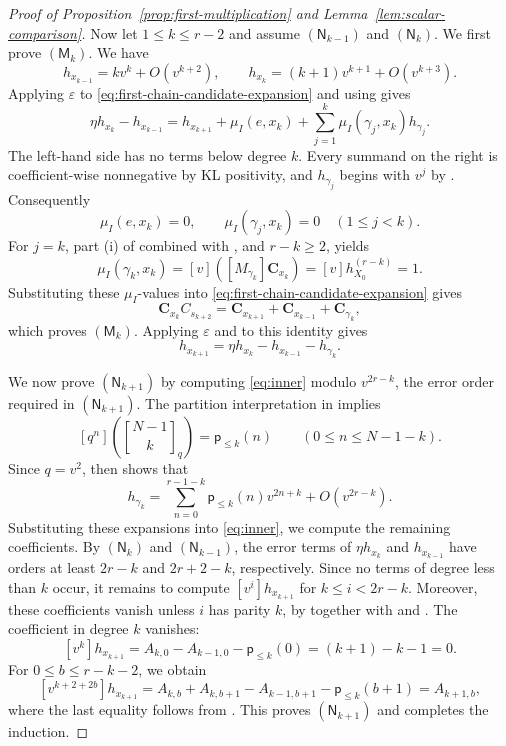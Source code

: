 \documentclass[11pt,a4paper,reqno]{amsart}
\numberwithin{equation}{section}
\theoremstyle{definition}
\theoremstyle{remark}
\theoremstyle{plain}
\newcommand{\C}{\mathbf C}
\newcommand{\eps}{\varepsilon}
\newcommand{\gb}[2]{\genfrac{[}{]}{0pt}{}{#1}{#2}_q}
\newcommand{\mus}{\mu_I}
\newcommand{\Part}{\mathsf p}
\begin{document}
\begin{proof}[Proof of Proposition~\ref{prop:first-multiplication} and
Lemma~\ref{lem:scalar-comparison}]
Now let $1\leq k\leq r-2$ and assume $(\mathsf N_{k-1})$ and $(\mathsf N_k)$.
We first prove $(\mathsf M_k)$.
We have
\[
h_{x_{k-1}}=kv^k+O(v^{k+2}), \qquad
h_{x_k}=(k+1)v^{k+1}+O(v^{k+3}). 
\]
Applying $\eps$ to \eqref{eq:first-chain-candidate-expansion} and using  gives
\begin{equation}\label{eq:first-chain-positive-corrections}
 \eta h_{x_k}-h_{x_{k-1}}
 =h_{x_{k+1}}+\mus(e,x_k)
   +\sum_{j=1}^{k}\mus(\gamma_j,x_k)h_{\gamma_j}.
\end{equation}
The left-hand side has no terms below degree $k$.
Every summand on the right is coefficient-wise nonnegative by KL positivity, and $h_{\gamma_j}$ begins with $v^j$ by .
Consequently
\[
 \mus(e,x_k)=0,\qquad
 \mus(\gamma_j,x_k)=0\quad(1\leq j<k).
\]
For $j=k$, part (i) of  combined with ,  and $r-k\geq 2$, yields
\begin{equation}\label{eq:first-chain-correction-multiplicities}
 \mus(\gamma_k,x_k)=[v]([M_{\gamma_k}]\C_{x_k})= [v]h_{X_0}^{(r-k)}=1.
\end{equation}
Substituting these $\mu_I$-values into \eqref{eq:first-chain-candidate-expansion} gives
\[
\C_{x_k}C_{s_{k+2}}
=\C_{x_{k+1}}+\C_{x_{k-1}}+\C_{\gamma_k},
\]
which proves $(\mathsf M_k)$.
Applying $\eps$ and  to this identity gives
\begin{equation}\label{eq:inner}
 h_{x_{k+1}}
 =\eta h_{x_k}-h_{x_{k-1}}-h_{\gamma_k}.
\end{equation}

We now prove $(\mathsf N_{k+1})$ by computing \eqref{eq:inner} modulo
$v^{2r-k}$, the error order required in $(\mathsf N_{k+1})$.
The partition interpretation in \cite[Proposition~1.7.3]{StanleyEC1} implies
\[
[q^n]\left(\gb{N-1}{k}\right)=\Part_{\leq k}(n)
\qquad(0\leq n\leq N-1-k).
\]
Since $q=v^2$,  then shows that
\[
h_{\gamma_k} =\sum_{n=0}^{r-1-k}\Part_{\leq k}(n)v^{2n+k}+O(v^{2r-k}).
\]
Substituting these expansions into \eqref{eq:inner}, we compute the remaining coefficients.
By $(\mathsf N_k)$ and $(\mathsf N_{k-1})$, the error terms of $\eta h_{x_k}$ and $h_{x_{k-1}}$ have orders at least $2r-k$ and $2r+2-k$, respectively.
Since no terms of degree less than $k$ occur, it remains to compute $[v^i]h_{x_{k+1}}$ for $k\leq i<2r-k$.
Moreover, these coefficients vanish unless $i$ has parity $k$, by  together with  and .
The coefficient in degree $k$ vanishes:
\[
[v^k]h_{x_{k+1}}
=A_{k,0}-A_{k-1,0}-\Part_{\leq k}(0)
=(k+1)-k-1=0.
\]
For $0\leq b\leq r-k-2$, we obtain
\[
[v^{k+2+2b}]h_{x_{k+1}}=
A_{k,b}+A_{k,b+1}-A_{k-1,b+1}-\Part_{\leq k}(b+1)=
A_{k+1,b},
\]
where the last equality follows from .
This proves $(\mathsf N_{k+1})$ and completes the induction.


\end{proof}
\end{document}

